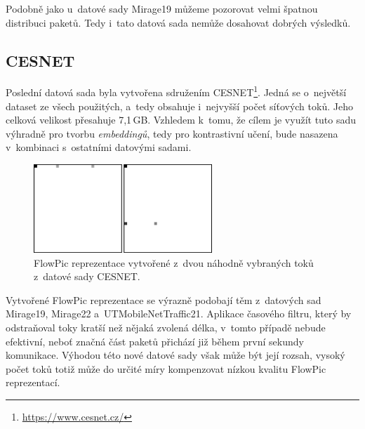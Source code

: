 Podobně jako u~datové sady Mirage19 můžeme pozorovat velmi špatnou distribuci paketů. Tedy i~tato datová sada nemůže dosahovat dobrých výsledků.

\subsection{CESNET}
\label{cesnet_dat}
Poslední datová sada byla vytvořena sdružením CESNET\footnote{\url{https://www.cesnet.cz/}}. Jedná se o~největší dataset ze všech použitých, a~tedy obsahuje i~nejvyšší počet síťových toků. Jeho celková velikost přesahuje 7,1\,GB. Vzhledem k~tomu, že cílem je využít tuto sadu výhradně pro tvorbu \textit{embeddingů}, tedy pro kontrastivní učení, bude nasazena v~kombinaci s~ostatními datovými sadami.

\begin{table}[H]
    \centering
    \caption{Analýza datové sady CESNET.}
    \label{utmob_filter}
\end{table}

\begin{figure}[H]
	\centering
	\includegraphics[width=0.6\textwidth]{obrazky-figures/cesnet_flowpics4.png}
	\caption{FlowPic reprezentace vytvořené z~dvou náhodně vybraných toků z~datové sady CESNET.}
	\label{cesnet_dataset}
\end{figure}

Vytvořené FlowPic reprezentace se výrazně podobají těm z~datových sad Mirage19, Mirage22 a~UTMobileNetTraffic21. Aplikace časového filtru, který by odstraňoval toky kratší než nějaká zvolená délka, v~tomto případě nebude efektivní, neboť značná část paketů přichází již během první sekundy komunikace. Výhodou této nové datové sady však může být její rozsah, vysoký počet toků totiž může do určité míry kompenzovat nízkou kvalitu FlowPic reprezentací.


